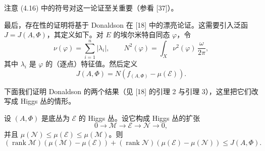 \begin{remark}
注意 (4.16) 中的符号对这一论证至关重要（参看 [37]）。
\end{remark}

最后，存在性的证明将基于 Donaldson 在 [18] 中的漂亮论证。这需要引入泛函 $J=J(A,\Phi)$，其定义如下。对 $E$ 的埃尔米特自同态 $\varphi$，令
\[
\nu(\varphi)=\sum_{i=1}^n|\lambda_i|,\qquad N^2(\varphi)=\int_X\nu^2(\varphi)\,\frac{\omega}{2\pi},
\]
其中 $\lambda_i$ 是 $\varphi$ 的（逐点）特征值。然后定义
\begin{equation}
J(A,\Phi)=N(f_{(A,\Phi)}-\mu(\mathcal{E})).
\label{eq:4.25}
\tag{4.25}
\end{equation}

下面我们证明 Donaldson 的两个结果（见 [18] 的引理 2 与引理 3），这里把它们改写成 Higgs 丛的情形。

\begin{lemma}
设 $(A,\Phi)$ 是底丛为 $\mathcal{E}$ 的 Higgs 丛。设它构成 Higgs 丛的扩张
\[
0\longrightarrow\mathcal{M}\longrightarrow\mathcal{E}\longrightarrow\mathcal{N}\longrightarrow0,
\]
并且 $\mu(\mathcal{N})\le\mu(\mathcal{E})\le\mu(\mathcal{M})$。则
\[
(\operatorname{rank}\mathcal{M})(\mu(\mathcal{M})-\mu(\mathcal{E}))+(\operatorname{rank}\mathcal{N})(\mu(\mathcal{E})-\mu(\mathcal{N}))\le J(A,\Phi).
\]
\end{lemma}


